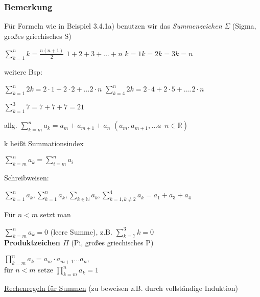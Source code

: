 \documentclass[a4paper, 12pt, twoside] {article}
\begin{document}
\subsubsection{Bemerkung} %
Für Formeln wie in Beispiel 3.4.1a) benutzen wir das \textit{Summenzeichen} $\Sigma$ (Sigma, großes griechisches S)

$\displaystyle\sum_{k = 1}^{n} k = \frac{n(n+1)}{2}$
$1 + 2 + 3 + ... +n$
$k = 1 k = 2 k = 3 k = n$ %

weitere Bsp:

$\sum_{k = 1}^{n} 2k = 2 \cdot 1 + 2 \cdot 2 + ... 2 \cdot n$
$\sum_{k=4}^{n} 2k = 2 \cdot 4 + 2 \cdot 5 + .... 2 \cdot n$

$\sum_{k=1}^{3} 7 = 7 + 7 + 7 = 21$ %

allg. $\sum_{k=m}^{n} a_k = a_m + a_{m+1} + a_n$
$(a_m, a_{m+1}, ... a–n \in \mathbb{R})$

k heißt Summationsindex

$\sum_{k=m}^{n} a_k = \sum_{i = m}^{n} a_i$

Schreibweisen:

$\displaystyle\sum_{k = 1}^{n} a_k, \sum_{k = 1}^{n} a_k, \sum_{k \in \mathbb{N}} a_k, \sum_{k=1, k \neq 2}^{4} a_k = a_1 + a_3 + a_4$

Für $n < m$ setzt man

$\sum_{k=m}^{n} a_k = 0$ (leere Summe), z.B. $\sum_{k=7}^{3} k = 0$ \\


\textbf{Produktzeichen $\Pi$} (Pi, großes griechisches P)

$\displaystyle\prod_{k=m}^{n} a_k = a_m  \cdot  a_{m+1} ... a_n,$ \\
für $n < m$ setze $\displaystyle\prod_{k=m}^{n} a_k = 1$

\underline{Rechenregeln für Summen} (zu beweisen z.B. durch vollständige Induktion)
\end{document}
